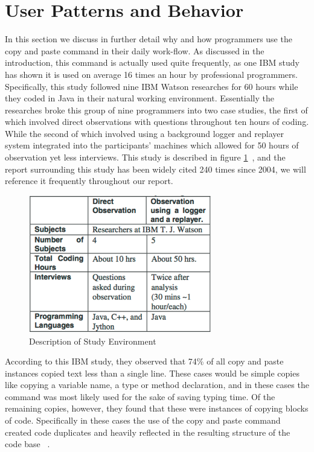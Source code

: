 \documentclass{acm_proc_article-sp}
\begin{document}
\section{User Patterns and Behavior}
In this section we discuss in further detail why and how programmers use the copy and paste command in their daily work-flow. As discussed in the introduction, this command is actually used quite frequently, as one IBM study has shown it is used on average 16 times an hour by professional programmers. Specifically, this study followed nine IBM Watson researches for 60 hours while they coded in Java in their natural working environment. Essentially the researches broke this group of nine programmers into two case studies, the first of which involved direct observations with questions throughout ten hours of coding. While the second of which involved using a background logger and replayer system integrated into the participants' machines which allowed for 50 hours of observation yet less interviews. This study is described in figure  \ref{fig:oopl}~\cite{ooplCP}, and the report surrounding this study has been widely cited 240 times since 2004, we will reference it frequently throughout our report.

 \begin{figure}[h]
 \centering
\includegraphics[width=8cm]{ooplStudy}
\caption{Description of Study Environment}
    \label{fig:oopl}
\end{figure}

According to this IBM study, they observed that 74\% of all copy and paste instances copied text less than a single line. These cases would be simple copies like copying a variable name, a type or method declaration, and in these cases the command was most likely used for the sake of saving typing time. Of the remaining copies, however, they found that these were instances of copying blocks of code. Specifically in these cases the use of the copy and paste command created code duplicates and heavily reflected in the resulting structure of the code base ~\cite{ooplCP}.
\end{document}
